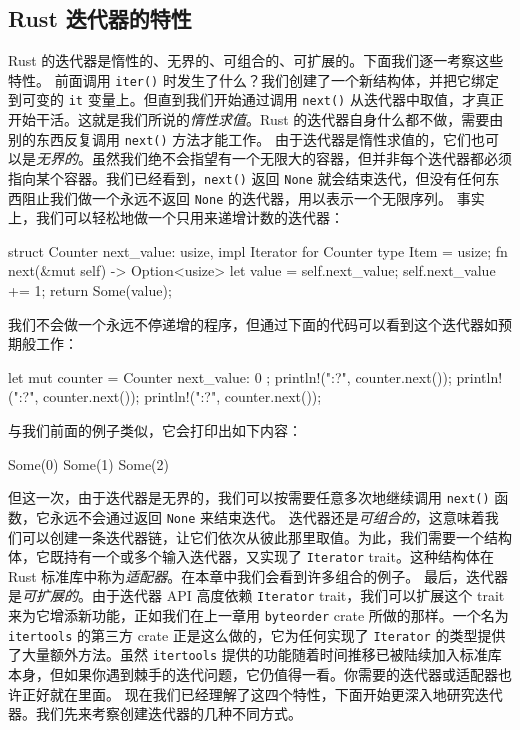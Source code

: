\subsection{Rust 迭代器的特性}
Rust 的迭代器是惰性的、无界的、可组合的、可扩展的。下面我们逐一考察这些特性。
前面调用 \texttt{iter()} 时发生了什么？我们创建了一个新结构体，并把它绑定到可变的 \texttt{it} 变量上。但直到我们开始通过调用 \texttt{next()} 从迭代器中取值，才真正开始干活。这就是我们所说的\emph{惰性求值}。Rust 的迭代器自身什么都不做，需要由别的东西反复调用 \texttt{next()} 方法才能工作。
\label{idx:idx_32478681}
由于迭代器是惰性求值的，它们也可以是\emph{无界的}。虽然我们绝不会指望有一个无限大的容器，但并非每个迭代器都必须指向某个容器。我们已经看到，\texttt{next()} 返回 \texttt{None} 就会结束迭代，但没有任何东西阻止我们做一个永远不返回 \texttt{None} 的迭代器，用以表示一个无限序列。
事实上，我们可以轻松地做一个只用来递增计数的迭代器：
\begin{codebox}[rust]
struct Counter {
    next_value: usize,
}
impl Iterator for Counter {
    type Item = usize;
    fn next(&mut self) -> Option<usize> {
        let value = self.next_value;
        self.next_value += 1;
        return Some(value);
    }
}
\end{codebox}
我们不会做一个永远不停递增的程序，但通过下面的代码可以看到这个迭代器如预期般工作：
\begin{codebox}[rust]
let mut counter = Counter { next_value: 0 };
println!("{:?}", counter.next());
println!("{:?}", counter.next());
println!("{:?}", counter.next());
\end{codebox}
与我们前面的例子类似，它会打印出如下内容：
\begin{codeboxdark}
Some(0)
Some(1)
Some(2)
\end{codeboxdark}
但这一次，由于迭代器是无界的，我们可以按需要任意多次地继续调用 \texttt{next()} 函数，它永远不会通过返回 \texttt{None} 来结束迭代。
迭代器还是\emph{可组合的}，这意味着我们可以创建一条迭代器链，让它们依次从彼此那里取值。为此，我们需要一个结构体，它既持有一个或多个输入迭代器，又实现了 \texttt{Iterator} trait。这种结构体在 Rust 标准库中称为\emph{适配器}。在本章中我们会看到许多组合的例子。
\label{idx:idx_22ef75b1}
最后，迭代器是\emph{可扩展的}。由于迭代器 API 高度依赖 \texttt{Iterator} trait，我们可以扩展这个 trait 来为它增添新功能，正如我们在上一章用 \texttt{byteorder} crate 所做的那样。一个名为 \texttt{itertools} 的第三方 crate 正是这么做的，它为任何实现了 \texttt{Iterator} 的类型提供了大量额外方法。虽然 \texttt{itertools} 提供的功能随着时间推移已被陆续加入标准库本身，但如果你遇到棘手的迭代问题，它仍值得一看。你需要的迭代器或适配器也许正好就在里面。
现在我们已经理解了这四个特性，下面开始更深入地研究迭代器。我们先来考察创建迭代器的几种不同方式。
